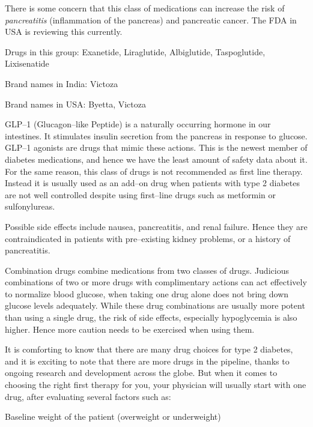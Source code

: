 There is some concern that this class of medications can increase the risk of \textit{pancreatitis} (inflammation of the pancreas) and pancreatic cancer. The FDA in USA is reviewing this currently.


Drugs in this group: Exanetide, Liraglutide, Albiglutide, Taspoglutide, Lixisenatide

Brand names in India: Victoza

Brand names in USA: Byetta, Victoza

GLP–1 (Glucagon–like Peptide) is a naturally occurring hormone in our intestines. It stimulates insulin secretion from the pancreas in response to glucose. GLP–1 agonists are drugs that mimic these actions. This is the newest member of diabetes medications, and hence we have the least amount of safety data about it. For the same reason, this class of drugs is not recommended as first line therapy. Instead it is usually used as an add–on drug when patients with type 2 diabetes are not well controlled despite using first–line drugs such as metformin or sulfonylureas.

Possible side effects include nausea, pancreatitis, and renal failure. Hence they are contraindicated in patients with pre–existing kidney problems, or a history of pancreatitis.


Combination drugs combine medications from two classes of drugs. Judicious combinations of two or more drugs with complimentary actions can act effectively to normalize blood glucose, when taking one drug alone does not bring down glucose levels adequately. While these drug combinations are usually more potent than using a single drug, the risk of side effects, especially hypoglycemia is also higher. Hence more caution needs to be exercised when using them.


It is comforting to know that there are many drug choices for type 2 diabetes, and it is exciting to note that there are more drugs in the pipeline, thanks to ongoing research and development across the globe. But when it comes to choosing the right first therapy for you, your physician will usually start with one drug, after evaluating several factors such as:

\item Baseline weight of the patient (overweight or underweight)

